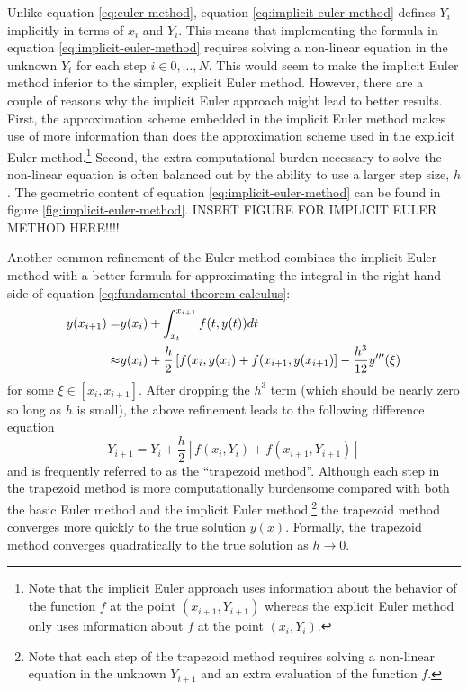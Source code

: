 \documentclass[11pt]{article}
\begin{document}
Unlike equation \ref{eq:euler-method}, equation \ref{eq:implicit-euler-method} defines $Y_i$ implicitly in terms of $x_i$ and $Y_i$.  This means that implementing the formula in equation \ref{eq:implicit-euler-method} requires solving a non-linear equation in the unknown $Y_i$ for each step $i\in0,\dots,N$. This would seem to make the implicit Euler method inferior to the simpler, explicit Euler method.  However, there are a couple of reasons why the implicit Euler approach might lead to better results. First, the approximation scheme embedded in the implicit Euler method makes use of more information than does the approximation scheme used in the explicit Euler method.\footnote{Note that the implicit Euler approach uses information about the behavior of the function $f$ at the point $(x_{i+1}, Y_{i+1})$ whereas the explicit Euler method only uses information about $f$ at the point $(x_i, Y_i)$.}  Second, the extra computational burden necessary to solve the non-linear equation is often balanced out by the ability to use a larger step size, $h$. The geometric content of equation \ref{eq:implicit-euler-method} can be found in figure \ref{fig:implicit-euler-method}. 
INSERT FIGURE FOR IMPLICIT EULER METHOD HERE!!!!

Another common refinement of the Euler method combines the implicit Euler method with a better formula for approximating the integral in the right-hand side of equation \ref{eq:fundamental-theorem-calculus}:
\begin{align}
	y(x_{i+1}) =& y(x_i) + \int_{x_t}^{x_{i+1}} f(t, y(t))dt \notag \\
	\approx& y(x_i) + \frac{h}{2}\left[f(x_i, y(x_i) + f(x_{i+1}, y(x_{i+1})\right] - \frac{h^3}{12}y'''(\xi)
\end{align} 
for some $\xi \in [x_i, x_{i+1}]$. After dropping the $h^3$ term (which should be nearly zero so long as $h$ is small), the above refinement leads to the following difference equation
\begin{equation}
	Y_{i+1} = Y_i + \frac{h}{2}\left[f(x_i, Y_i) + f(x_{i+1}, Y_{i+1})\right] 
\end{equation}
and is frequently referred to as the ``trapezoid method''.  Although each step in the trapezoid method is more computationally burdensome compared with both the basic Euler method and the implicit Euler method,\footnote{Note that each step of the trapezoid method requires solving a non-linear equation in the unknown $Y_{i+1}$ and an extra evaluation of the function $f$.} the trapezoid method converges more quickly to the true solution $y(x)$.  Formally, the trapezoid method converges quadratically to the true solution as $h\rightarrow 0$.  
\end{document}

